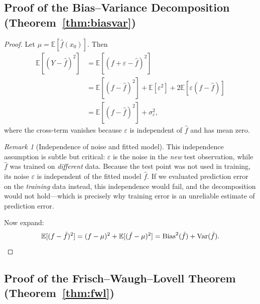 \documentclass[11pt,a4paper]{article}
\theoremstyle{definition}
\theoremstyle{plain}
\theoremstyle{remark}
\newtheorem{remark}{Remark}[section]
\newcommand{\E}{\mathbb{E}}
\newcommand{\Var}{\operatorname{Var}}
\newcommand{\Bias}{\operatorname{Bias}}
\begin{document}
\subsection{Proof of the Bias--Variance Decomposition (Theorem~\ref{thm:biasvar})}

\begin{proof}
Let $\mu = \E[\hat{f}(x_0)]$.  Then
\begin{align*}
  \E[(Y - \hat{f})^2]
  &= \E[(f + \varepsilon - \hat{f})^2] \\
  &= \E[(f - \hat{f})^2] + \E[\varepsilon^2] + 2\E[\varepsilon(f - \hat{f})] \\
  &= \E[(f - \hat{f})^2] + \sigma^2_\varepsilon,
\end{align*}
where the cross-term vanishes because $\varepsilon$ is independent of $\hat{f}$ and has mean zero.

\begin{remark}[Independence of noise and fitted model]
This independence assumption is subtle but critical: $\varepsilon$ is the noise in the \emph{new} test observation, while $\hat{f}$ was trained on \emph{different} data. Because the test point was not used in training, its noise $\varepsilon$ is independent of the fitted model $\hat{f}$. If we evaluated prediction error on the \emph{training} data instead, this independence would fail, and the decomposition would not hold---which is precisely why training error is an unreliable estimate of prediction error.
\end{remark}
Now expand:
\[
  \E[(f - \hat{f})^2]
  = (f - \mu)^2 + \E[(\hat{f} - \mu)^2]
  = \Bias^2(\hat{f}) + \Var(\hat{f}). \qedhere
\]
\end{proof}

\subsection{Proof of the Frisch--Waugh--Lovell Theorem (Theorem~\ref{thm:fwl})}
\end{document}
